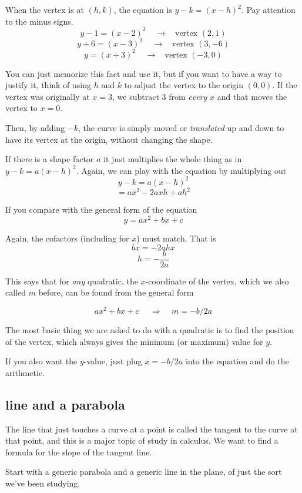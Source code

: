 \documentclass[11pt, oneside]{article}
\begin{document}
When the vertex is at $(h,k)$, the equation is $y - k = (x - h)^2$.  Pay attention to the minus signs.
\[ y - 1 = (x - 2)^2 \ \ \ \ \ \rightarrow \ \ \ \ \text{vertex } (2,1) \]
\[ y + 6 = (x - 3)^2 \ \ \ \ \ \rightarrow \ \ \ \ \text{vertex } (3,-6) \]
\[ y = (x + 3)^2 \ \ \ \ \ \rightarrow \ \ \ \ \text{vertex } (-3,0) \]

You can just memorize this fact and use it, but if you want to have a way to justify it, think of using $h$ and $k$ to adjust the vertex to the origin $(0,0)$.  If the vertex was originally at $x = 3$, we subtract $3$ from \emph{every} $x$ and that moves the vertex to $x = 0$.

Then, by adding $-k$, the curve is simply moved or \emph{translated} up and down to have its vertex at the origin, without changing the shape.

If there is a shape factor $a$ it just multiplies the whole thing as in $y - k = a(x - h)^2$.  Again, we can play with the equation by multiplying out
\[ y - k = a(x - h)^2 \]
\[ = ax^2 - 2axh + ah^2 \]

If you compare with the general form of the equation
\[ y = ax^2 + bx + c \]

Again, the cofactors (including for $x$) must match.  That is
\[ bx = - 2ahx \]
\[ h = - \frac{b}{2a} \]

This says that for \emph{any} quadratic, the $x$-coordinate of the vertex, which we also called $m$ before, can be found from the general form

\[ ax^2 + bx + c  \ \ \ \ \ \ \Rightarrow  \ \ \ \ \ m = -b/2a \]

The most basic thing we are asked to do with a quadratic is to find the position of the vertex, which always gives the minimum (or maximum) value for $y$.

If you also want the $y$-value, just plug $x = -b/2a$ into the equation and do the arithmetic.

\subsection*{line and a parabola}

The line that just touches a curve at a point is called the tangent to the curve at that point, and this is a major topic of study in calculus.  We want to find a formula for the slope of the tangent line.

Start with a generic parabola and a generic line in the plane, of just the sort we've been studying.
\end{document}
